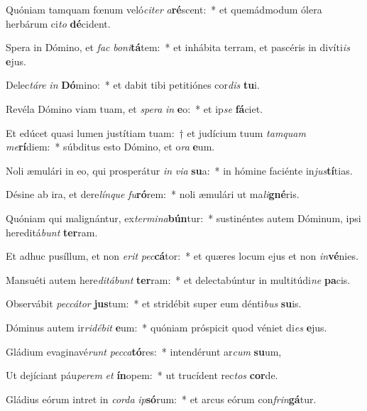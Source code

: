\item Quóniam tamquam fœnum veló\textit{ci}\textit{ter} \textit{a}\textbf{ré}scent:~* et quemádmodum ólera herbárum ci\textit{to} \textbf{dé}cident.
\item Spera in Dómino, et \textit{fac} \textit{bo}\textit{ni}\textbf{tá}tem:~* et inhábita terram, et pascéris in divíti\textit{is} \textbf{e}jus.
\item Delec\textit{tá}\textit{re} \textit{in} \textbf{Dó}mino:~* et dabit tibi petitiónes cor\textit{dis} \textbf{tu}i.
\item Revéla Dómino viam tuam, et \textit{spe}\textit{ra} \textit{in} \textbf{e}o:~* et ip\textit{se} \textbf{fá}ciet.
\item Et edúcet quasi lumen justítiam tuam:~† et judícium tuum \textit{tam}\textit{quam} \textit{me}\textbf{rí}diem:~* súbditus esto Dómino, et o\textit{ra} \textbf{e}um.
\item Noli æmulári in eo, qui prosperátur \textit{in} \textit{vi}\textit{a} \textbf{su}a:~* in hómine faciénte in\textit{jus}\textbf{tí}tias.
\item Désine ab ira, et dere\textit{lín}\textit{que} \textit{fu}\textbf{ró}rem:~* noli æmulári ut ma\textit{li}\textbf{gné}ris.
\item Quóniam qui malignántur, ex\textit{ter}\textit{mi}\textit{na}\textbf{bún}tur:~* sustinéntes autem Dóminum, ipsi hereditá\textit{bunt} \textbf{ter}ram.
\item Et adhuc pusíllum, et non \textit{e}\textit{rit} \textit{pec}\textbf{cá}tor:~* et quæres locum ejus et non \textit{in}\textbf{vé}nies.
\item Mansuéti autem here\textit{di}\textit{tá}\textit{bunt} \textbf{ter}ram:~* et delectabúntur in multitúdi\textit{ne} \textbf{pa}cis.
\item Observábit \textit{pec}\textit{cá}\textit{tor} \textbf{jus}tum:~* et stridébit super eum dénti\textit{bus} \textbf{su}is.
\item Dóminus autem ir\textit{ri}\textit{dé}\textit{bit} \textbf{e}um:~* quóniam próspicit quod véniet di\textit{es} \textbf{e}jus.
\item Gládium evaginavé\textit{runt} \textit{pec}\textit{ca}\textbf{tó}res:~* intendérunt ar\textit{cum} \textbf{su}um,
\item Ut dejíciant páu\textit{pe}\textit{rem} \textit{et} \textbf{ín}opem:~* ut trucídent rec\textit{tos} \textbf{cor}de.
\item Gládius eórum intret in \textit{cor}\textit{da} \textit{ip}\textbf{só}rum:~* et arcus eórum con\textit{frin}\textbf{gá}tur.
